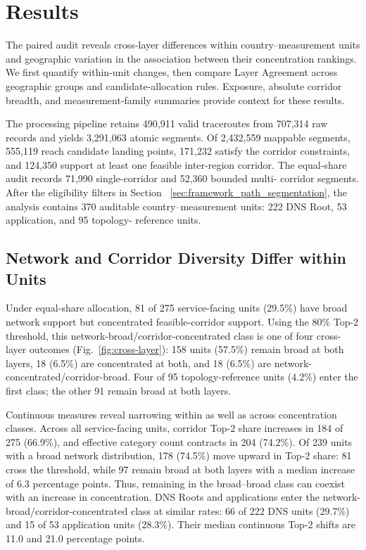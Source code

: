 \section{Results}
\label{sec:result}

The paired audit reveals cross-layer differences within country--measurement
units and geographic variation in the association between their
concentration rankings. We first quantify within-unit changes, then compare
Layer Agreement across geographic groups and candidate-allocation rules.
Exposure, absolute corridor breadth, and measurement-family summaries
provide context for these results.

The processing pipeline retains 490,911 valid traceroutes from 707,314 raw
records and yields 3,291,063 atomic segments. Of 2,432,559 mappable segments,
555,119 reach candidate landing points, 171,232 satisfy the corridor
constraints, and 124,350 support at least one feasible inter-region corridor.
The equal-share audit records 71,990 single-corridor and 52,360 bounded multi-
corridor segments. After the eligibility filters in Section
~\ref{sec:framework_path_segmentation}, the analysis contains 370 auditable
country--measurement units: 222 DNS Root, 53 application, and 95 topology-
reference units.

\subsection{Network and Corridor Diversity Differ within Units}
\label{subsec:cross-layer}

Under equal-share allocation, 81 of 275 service-facing units (29.5\%) have
broad network support but concentrated feasible-corridor support.
Using the 80\% Top-2 threshold, this network-broad/corridor-concentrated
class is one of four cross-layer outcomes (Fig.~\ref{fig:cross-layer}):
158 units (57.5\%) remain broad at both layers, 18 (6.5\%) are concentrated at
both, and 18 (6.5\%) are network-concentrated/corridor-broad. Four of 95
topology-reference units (4.2\%) enter the first class; the other 91 remain
broad at both layers.

Continuous measures reveal narrowing within as well as across concentration
classes. Across all service-facing units, corridor Top-2 share increases in
184 of 275 (66.9\%), and effective category count contracts in 204 (74.2\%).
Of 239 units with a broad network distribution, 178 (74.5\%) move upward in
Top-2 share: 81 cross the threshold, while 97 remain broad at both layers
with a median increase of 6.3 percentage points. Thus, remaining in the
broad--broad class can coexist with an increase in concentration. DNS Roots
and applications enter the network-broad/corridor-concentrated class at
similar rates: 66 of 222 DNS units (29.7\%) and 15 of 53 application units
(28.3\%). Their median continuous Top-2 shifts are 11.0 and 21.0 percentage
points.

